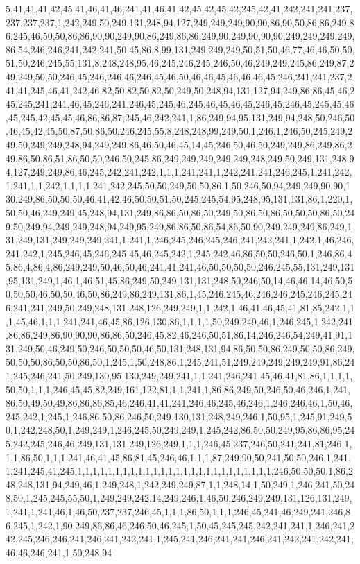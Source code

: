 5,41,41,41,42,45,41,46,41,46,241,41,46,41,42,45,42,45,42,245,42,41,242,241,241,237,237,237,237,1,242,249,50,249,131,248,94,127,249,249,249,90,90,86,90,50,86,86,249,86,245,46,50,50,86,86,90,90,249,90,86,249,86,86,249,90,249,90,90,90,249,249,249,249,86,54,246,246,241,242,241,50,45,86,8,99,131,249,249,249,50,51,50,46,77,46,46,50,50,51,50,246,245,55,131,8,248,248,95,46,245,246,245,246,50,46,249,249,245,86,249,87,249,249,50,50,246,45,246,246,46,246,45,46,50,46,46,45,46,46,46,45,246,241,241,237,241,41,245,46,41,242,46,82,50,82,50,82,50,249,50,248,94,131,127,94,249,86,86,45,46,245,245,241,241,46,45,246,241,246,45,245,46,245,46,45,46,45,246,45,246,45,245,45,46,45,245,42,45,45,46,86,86,87,245,46,242,241,1,86,249,94,95,131,249,94,248,50,246,50,46,45,42,45,50,87,50,86,50,246,245,55,8,248,248,99,249,50,1,246,1,246,50,245,249,249,50,249,249,248,94,249,249,86,46,50,46,45,14,45,246,50,46,50,249,249,86,249,86,249,86,50,86,51,86,50,50,246,50,245,86,249,249,249,249,249,248,249,50,249,131,248,94,127,249,249,86,46,245,242,241,242,1,1,1,241,241,1,242,241,241,246,245,1,241,242,1,241,1,1,242,1,1,1,1,241,242,245,50,50,249,50,50,86,1,50,246,50,94,249,249,90,90,130,249,86,50,50,50,46,41,42,46,50,50,51,50,245,245,54,95,248,95,131,131,86,1,220,1,50,50,46,249,249,45,248,94,131,249,86,86,50,86,50,249,50,86,50,86,50,50,50,86,50,249,50,249,94,249,249,248,94,249,95,249,86,86,50,86,54,86,50,90,249,249,249,86,249,131,249,131,249,249,249,241,1,241,1,246,245,246,245,246,241,242,241,1,242,1,46,246,241,242,1,245,246,45,246,245,45,46,245,242,1,245,242,46,86,50,50,246,50,1,246,86,45,86,4,86,4,86,249,249,50,46,50,46,241,41,241,46,50,50,50,50,246,245,55,131,249,131,95,131,249,1,46,1,46,51,45,86,249,50,249,131,131,248,50,246,50,14,46,46,14,46,50,50,50,50,46,50,50,46,50,86,249,86,249,131,86,1,45,246,245,46,246,246,245,246,245,246,241,241,249,50,249,248,131,248,126,249,249,1,1,242,1,46,41,46,45,41,81,85,242,1,1,1,45,46,1,1,1,241,241,46,45,86,126,130,86,1,1,1,1,50,249,249,46,1,246,245,1,242,241,86,86,249,86,90,90,90,86,86,50,246,45,82,46,246,50,51,86,14,246,246,54,249,41,91,131,249,50,46,249,50,246,50,50,50,46,50,131,248,131,94,86,50,50,86,249,50,50,86,249,50,50,50,86,50,50,86,50,1,245,1,50,248,86,1,245,241,51,249,249,249,249,249,91,86,241,245,246,241,50,249,130,95,130,249,249,241,1,1,241,246,241,45,46,41,81,86,1,1,1,1,50,50,1,1,1,246,45,45,82,249,161,122,81,1,1,241,1,86,86,249,50,246,50,46,246,1,241,86,50,49,50,49,86,86,86,85,46,246,41,41,241,246,46,245,46,246,1,246,246,46,1,50,46,245,242,1,245,1,246,86,50,86,246,50,249,130,131,248,249,246,1,50,95,1,245,91,249,50,1,242,248,50,1,249,249,1,246,245,50,249,249,1,245,242,86,50,50,249,95,86,86,95,245,242,245,246,46,249,131,131,249,126,249,1,1,1,246,45,237,246,50,241,241,81,246,1,1,1,86,50,1,1,1,241,46,41,45,86,81,45,246,46,1,1,1,87,249,90,50,241,50,50,246,1,241,1,241,245,41,245,1,1,1,1,1,1,1,1,1,1,1,1,1,1,1,1,1,1,1,1,1,1,1,1,1,1,246,50,50,50,1,86,248,248,131,94,249,46,1,249,248,1,242,249,249,87,1,1,248,14,1,50,249,1,246,241,50,248,50,1,245,245,55,50,1,249,249,242,14,249,246,1,46,50,246,249,249,131,126,131,249,1,241,1,241,46,1,46,50,237,237,246,45,1,1,1,86,50,1,1,1,246,45,241,46,249,241,246,86,245,1,242,1,90,249,86,86,46,246,50,46,245,1,50,45,245,245,242,241,241,1,246,241,242,245,246,246,241,246,241,242,241,1,245,241,246,241,241,246,241,242,241,242,241,46,46,246,241,1,50,248,94